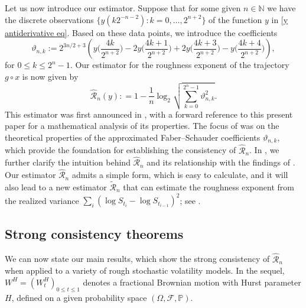 \documentclass[12pt,reqno]{article}
\def\Om{\Omega}\def\om{\omega}
\def\wh{\widehat}
\def\wt{\widetilde}
\numberwithin{equation}{section}
\def\cF{{\mathscr F}}
\def\cR{{\mathscr R}}
\theoremstyle{definition}
\def\wt#1{\widetilde{#1}}
\def\wh{\widehat}
\def\wt{\widetilde}
\newcommand{\bN}{\mathbb{N}}
\newcommand{\bP}{\mathbb{P}}
\begin{document}
Let us now introduce our estimator. Suppose that for some given  $n\in\bN$  we have the  discrete observations $\{y(k2^{-n-2}):k=0,\dots, 2^{n+2}\}$ of the function  $y$ in \eqref{y antiderivative eq}. Based on these data points, we introduce the coefficients
\begin{equation}\label{eq vartheta}
\vartheta_{n,k}:= 2^{3n/2+3}\left(y\Big(\frac{4k}{2^{n+2}}\Big)-2y\Big(\frac{4k+1}{2^{n+2}}\Big)+2y\Big(\frac{4k+3}{2^{n+2}}\Big)-y\Big(\frac{4k+4}{2^{n+2}}\Big)\right),
\end{equation}
for $0 \le k \le 2^{n}-1$.
Our estimator for the roughness exponent of the trajectory $g\circ x$ is now given by
\begin{equation}\label{wh Rn eq}
\wh\cR_n(y): = 1-\frac{1}{n}\log_2 \sqrt{\sum_{k = 0}^{2^{n}-1}\vartheta_{n,k}^2}.
\end{equation}
This estimator  was first announced in \cite[Remark 2.2]{HanSchiedMatrix}, with a forward reference to this present paper for a mathematical analysis of its properties. The focus of \cite{HanSchiedMatrix} was on the theoretical properties of the approximated Faber–Schauder coefficients $\vartheta_{n,k}$, which provide the foundation for establishing the consistency of $\wh\cR_n$. In , we further clarify the intuition behind $\wh\cR_n$ and its relationship with the findings of \cite{HanSchiedMatrix, HanSchiedHurst}. Our estimator $\wh\cR_n$ admits a simple form, which is easy to calculate, and it will also lead to a new estimator $\wt\cR_n$ that can estimate the roughness exponent from  the realized variance $\sum_i(\log S_{t_i}-\log S_{t_{i-1}})^2$; see . 



\subsection{Strong consistency theorems}\label{consistency section}

We can now state our main results,  which show the strong consistency of $\wh\cR_n$ when applied to 
a variety of rough stochastic volatility models. In the sequel, $W^H=(W^H_t)_{0\le t\le1}$  denotes a fractional Brownian motion with Hurst parameter $H$, defined on a given probability space $(\Om,\cF,\bP)$.
\end{document}
